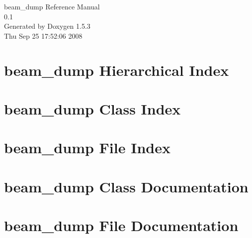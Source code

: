 \documentclass[a4paper]{book}
\begin{document}
\begin{titlepage}
\vspace*{7cm}
\begin{center}
{\Large beam\_\-dump Reference Manual\\[1ex]\large 0.1 }\\
\vspace*{1cm}
{\large Generated by Doxygen 1.5.3}\\
\vspace*{0.5cm}
{\small Thu Sep 25 17:52:06 2008}\\
\end{center}
\end{titlepage}
\clearemptydoublepage
{}
\tableofcontents
\clearemptydoublepage
{}
\chapter{beam\_\-dump Hierarchical Index}

\chapter{beam\_\-dump Class Index}

\chapter{beam\_\-dump File Index}

\chapter{beam\_\-dump Class Documentation}








\chapter{beam\_\-dump File Documentation}








\printindex
\end{document}
